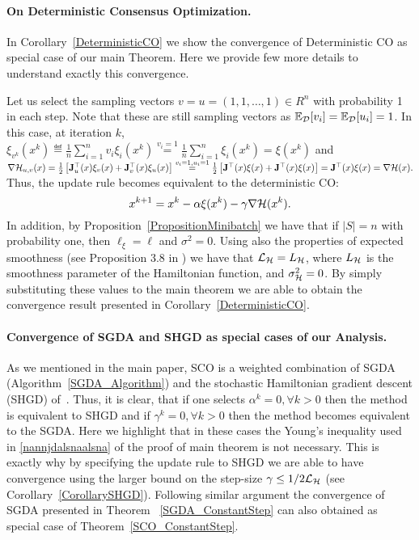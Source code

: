 \documentclass{article}
\begin{document}
\paragraph{On Deterministic Consensus Optimization.} In Corollary~\ref{DeterministicCO} we show the convergence of Deterministic CO as special case of our main Theorem. Here we provide few more details to understand exactly this convergence. 

Let us select the sampling vectors $v = u= (1,1, \dots, 1) \in R^n$ with probability 1 in each step. Note that these are still sampling vectors as $\mathbb{E}_{{\cal D}}[v_i]=\mathbb{E}_{{\cal D}}[u_i]=1$. In this case, at iteration $k$, $\xi_{v^k}(x^k) \eqdef \frac{1}{n} \sum _{i=1}^n v_i \xi_i(x^k)\overset{v_i=1}{=} \frac{1}{n} \sum _{i=1}^n \xi_i(x^k)=\xi(x^k)$ and $\nabla {\cal H}_{u,v}(x)=\frac{1}{2} \left[ \mathbf{J}_u^\top(x) \xi_v(x) +   \mathbf{J}_v^\top(x) \xi_u(x) \right]\overset{v_i=1,u_i=1}{=}\frac{1}{2} \left[ \mathbf{J}^\top(x) \xi(x) +   \mathbf{J}^\top(x) \xi(x) \right]=\mathbf{J}^\top(x) \xi(x)=\nabla {\cal H}(x).$ Thus, the update rule becomes equivalent to the deterministic CO: $$x^{k+1}=x^k - \alpha \xi(x^k) - \gamma \nabla {\cal H}(x^k).$$ In addition, by Proposition~\ref{PropositionMinibatch} we have that if $|S|=n$ with probability one, then $\ell_\xi=\ell$ and $\sigma^2=0$. Using also the properties of expected smoothness (see Proposition 3.8 in \cite{gower2019sgd}) we have that ${\cal L}_{{\cal H}}=L_{{\cal H}}$, where $L_{{\cal H}}$ is the smoothness parameter of the Hamiltonian function, and $\sigma_{\cal H}^2=0$. By simply substituting these values to the main theorem we are able to obtain the convergence result presented in Corollary~\ref{DeterministicCO}.

\paragraph{Convergence of SGDA and SHGD as special cases of our Analysis.} As we mentioned in the main paper, SCO
is a weighted combination of SGDA (Algorithm~\ref{SGDA_Algorithm}) and the stochastic Hamiltonian gradient descent (SHGD) of~\cite{loizou2020stochastic}. Thus, it is clear, that if one selects $\alpha^k=0, \forall k >0 $ then the method is equivalent to SHGD and if $ \gamma^k=0, \forall k >0 $ then the method becomes equivalent to the SGDA.
Here we highlight that in these cases the Young's inequality used in \eqref{nannjdalsnaalsna} of the proof of main theorem is not necessary. This is exactly why by specifying the update rule to SHGD we are able to have convergence using the larger bound on the step-size $\gamma \leq 1/2{\cal L}_{{\cal H}}$ (see Corollary~\ref{CorollarySHGD}). Following similar argument the convergence of SGDA presented in Theorem ~\ref{SGDA_ConstantStep} can also obtained as special case of Theorem~\ref{SCO_ConstantStep}.
\end{document}

